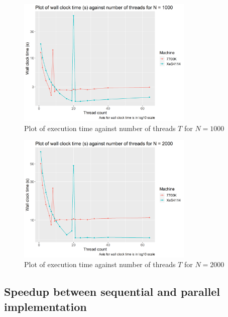 \documentclass[12pt]{article}
\begin{document}
\begin{figure}[H]
    \centering
    \includegraphics[width=0.75\textwidth]{./processedResults/par-1000N-varyThreads}
    \caption{Plot of execution time against number of threads $T$ for $N = 1000$}
    \label{fig:par-1000N-varyThreads}
\end{figure}

\begin{figure}[H]
    \centering
    \includegraphics[width=0.75\textwidth]{./processedResults/par-2000N-varyThreads}
    \caption{Plot of execution time against number of threads $T$ for $N = 2000$}
    \label{fig:par-2000N-varyThreads}
\end{figure}

\subsection{Speedup between sequential and parallel implementation}
\end{document}
